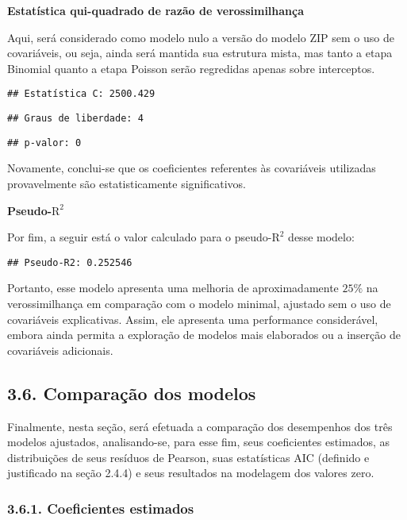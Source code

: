 \documentclass[
]{article}
\begin{document}
\textbf{Estatística qui-quadrado de razão de verossimilhança}

Aqui, será considerado como modelo nulo a versão do modelo ZIP sem o uso
de covariáveis, ou seja, ainda será mantida sua estrutura mista, mas
tanto a etapa Binomial quanto a etapa Poisson serão regredidas apenas
sobre interceptos.

\begin{verbatim}
## Estatística C: 2500.429
\end{verbatim}

\begin{verbatim}
## Graus de liberdade: 4
\end{verbatim}

\begin{verbatim}
## p-valor: 0
\end{verbatim}

Novamente, conclui-se que os coeficientes referentes às covariáveis
utilizadas provavelmente são estatisticamente significativos.

\textbf{Pseudo-\(\text{R}^2\)}

Por fim, a seguir está o valor calculado para o pseudo-\(\text{R}^2\)
desse modelo:

\begin{verbatim}
## Pseudo-R2: 0.252546
\end{verbatim}

Portanto, esse modelo apresenta uma melhoria de aproximadamente \(25\%\)
na verossimilhança em comparação com o modelo minimal, ajustado sem o
uso de covariáveis explicativas. Assim, ele apresenta uma performance
considerável, embora ainda permita a exploração de modelos mais
elaborados ou a inserção de covariáveis adicionais.

\subsection{3.6. Comparação dos
modelos}\label{comparauxe7uxe3o-dos-modelos}

Finalmente, nesta seção, será efetuada a comparação dos desempenhos dos
três modelos ajustados, analisando-se, para esse fim, seus coeficientes
estimados, as distribuições de seus resíduos de Pearson, suas
estatísticas AIC (definido e justificado na seção 2.4.4) e seus
resultados na modelagem dos valores zero.

\subsubsection{3.6.1. Coeficientes
estimados}\label{coeficientes-estimados}
\end{document}
